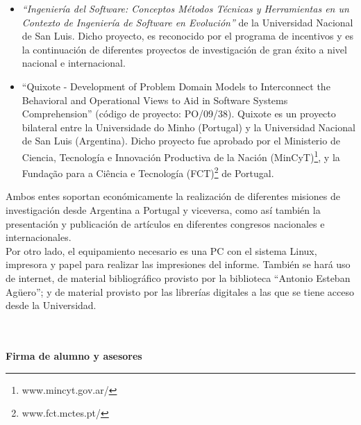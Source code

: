 \documentclass[a4paper,12pt]{report}
\begin{document}
\begin{itemize}
\itemsep0em%
\item \textit{“Ingeniería del Software: Conceptos Métodos Técnicas y 
Herramientas en un Contexto de Ingeniería de Software en Evolución”} de la Universidad 
Nacional de San Luis. 
Dicho proyecto, es reconocido por el programa de incentivos y es la continuación de 
diferentes proyectos de investigación de gran éxito a nivel nacional e internacional.

\item “Quixote - Development of Problem Domain Models to Interconnect the Behavioral and Operational Views to Aid in Software Systems Comprehension” (código de proyecto: PO/09/38).  Quixote es un proyecto bilateral entre la Universidade do Minho (Portugal) y la Universidad Nacional de San Luis (Argentina). Dicho proyecto fue aprobado por el Ministerio de Ciencia, Tecnología e Innovación Productiva de la Nación (MinCyT)\footnote[1]{www.mincyt.gov.ar/}, y la Fundação para a Ciência e Tecnología (FCT)\footnote[2]{www.fct.mctes.pt/} de Portugal. 

\end{itemize}

\hspace{0.5cm}Ambos entes soportan económicamente la realización de diferentes misiones de investigación desde Argentina a Portugal y viceversa, como así también la presentación y publicación de artículos en diferentes congresos nacionales e internacionales.\\

\hspace{0.5cm}Por otro lado, el equipamiento necesario es una PC con el sistema Linux, impresora y papel para realizar las impresiones del informe. También se hará uso de internet, de material bibliográfico provisto por la biblioteca “Antonio Esteban Agüero”; y  de material provisto por las librerías digitales a las que se tiene acceso desde la Universidad.



\renewcommand{\bibname}{\normalsize \textbf{Bibliografía}}


\nocite{*}%

{\textbf{\\\\Firma de alumno y asesores}}
\end{document}
